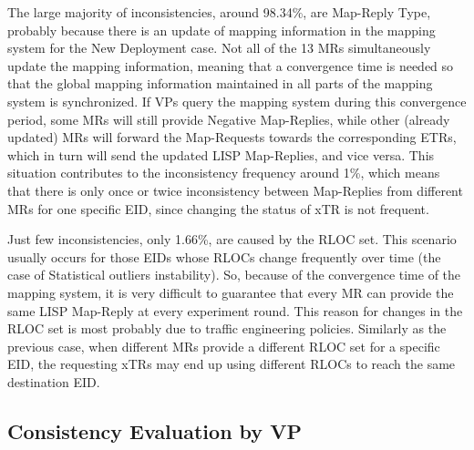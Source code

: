 The large majority of inconsistencies, around 98.34\%, are Map-Reply Type, probably because there is an update of mapping information in the mapping system for the New Deployment case. Not all of the 13 MRs simultaneously update the mapping information, meaning that a convergence time is needed so that the global mapping information maintained in all parts of the mapping system is synchronized. If VPs query the mapping system during this convergence period, some MRs will still provide Negative Map-Replies, while other (already updated) MRs will forward the Map-Requests towards the corresponding ETRs, which in turn will send the updated LISP Map-Replies, and vice versa. This situation contributes to the inconsistency frequency around 1\%, which means that there is only once or twice inconsistency between Map-Replies from different MRs for one specific EID, since changing the status of xTR is not frequent.

Just few inconsistencies, only 1.66\%, are caused by the RLOC set. This scenario usually occurs for those EIDs whose RLOCs change frequently over time (the case of Statistical outliers instability). So, because of the convergence time of the mapping system, it is very difficult to guarantee that every MR can provide the same LISP Map-Reply at every experiment round. This reason for changes in the RLOC set is most probably due to traffic engineering policies. Similarly as the previous case, when different MRs provide a different RLOC set for a specific EID, the requesting xTRs may end up using different RLOCs to reach the same destination EID.
 

\subsection{Consistency Evaluation by VP}
\label{subsec:mds_consistency_VP}

